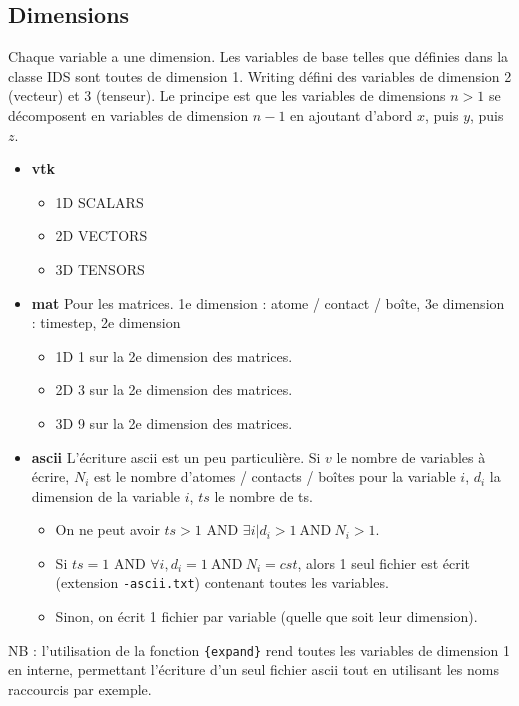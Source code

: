 \documentclass[a4paper,12pt]{article}
\begin{document}
{{{\subsection{Dimensions}
Chaque variable a une dimension. Les variables de base telles que d\'efinies dans la classe IDS sont toutes de dimension 1. Writing d\'efini des variables de dimension 2 (vecteur) et 3 (tenseur). Le principe est que les variables de dimensions $n>1$ se d\'ecomposent en variables de dimension $n-1$ en ajoutant d'abord $x$, puis $y$, puis $z$. 

\begin{itemize}
\item \textbf{vtk} 
\begin{itemize}
\item 1D  SCALARS
\item 2D  VECTORS
\item 3D  TENSORS
\end{itemize}
\item \textbf{mat}  Pour les matrices. 1e dimension : atome / contact / bo\^ite, 3e dimension : timestep, 2e dimension \begin{itemize}
\item 1D  1 sur la 2e dimension des matrices. 
\item 2D  3 sur la 2e dimension des matrices.
\item 3D  9 sur la 2e dimension des matrices.
\end{itemize}
\item \textbf{ascii}  L'\'ecriture ascii est un peu particuli\`ere. Si $v$ le nombre de variables \`a \'ecrire, $N_i$ est le nombre d'atomes / contacts / bo\^ites pour la variable $i$, $d_i$ la dimension de la variable $i$, $ts$ le nombre de ts.
\begin{itemize}
\item On ne peut avoir $ts>1$ AND $\exists i \left | d_i>1\ \text{AND}\ N_i>1 \right .$.
\item Si $ts=1$ AND $\forall i, d_i=1\ \text{AND}\ N_i=cst$, alors 1 seul fichier est \'ecrit (extension \verb+-ascii.txt+) contenant toutes les variables.
\item Sinon, on \'ecrit 1 fichier par variable (quelle que soit leur dimension).
\end{itemize}
\end{itemize}

NB : l'utilisation de la fonction \verb+{expand}+ rend toutes les variables de dimension 1 en interne, permettant l'\'ecriture d'un seul fichier ascii tout en utilisant les noms raccourcis par exemple. 


}}}
\end{document}
